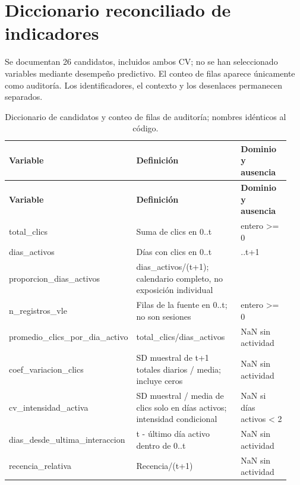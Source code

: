 \section{Diccionario reconciliado de indicadores}
Se documentan 26 candidatos, incluidos ambos CV; no se han seleccionado variables mediante desempeño predictivo. El conteo de filas aparece únicamente como auditoría. Los identificadores, el contexto y los desenlaces permanecen separados.
\Needspace{0.2\textheight}
\begingroup\small\setlength{\tabcolsep}{3pt}\renewcommand{\arraystretch}{1.16}
\begin{longtable}{>{\raggedright\arraybackslash}p{0.29\linewidth}>{\raggedright\arraybackslash}p{0.43\linewidth}>{\raggedright\arraybackslash}p{0.22\linewidth}}
\caption{Diccionario de candidatos y conteo de filas de auditoría; nombres idénticos al código.}\label{corr:diccionario}\\
\toprule
\textbf{Variable} & \textbf{Definición} & \textbf{Dominio y ausencia} \\
\midrule\endfirsthead
\toprule
\textbf{Variable} & \textbf{Definición} & \textbf{Dominio y ausencia} \\
\midrule\endhead
\bottomrule\endfoot
total\_\allowbreak{}clics & Suma de clics en 0..t & entero >= 0 \\
dias\_\allowbreak{}activos & Días con clics en 0..t & 0..t+1 \\
proporcion\_\allowbreak{}dias\_\allowbreak{}activos & dias\_\allowbreak{}activos/(t+1); calendario completo, no exposición individual & [0,1] \\
n\_\allowbreak{}registros\_\allowbreak{}vle & Filas de la fuente en 0..t; no son sesiones & entero >= 0 \\
promedio\_\allowbreak{}clics\_\allowbreak{}por\_\allowbreak{}dia\_\allowbreak{}activo & total\_\allowbreak{}clics/dias\_\allowbreak{}activos & NaN sin actividad \\
coef\_\allowbreak{}variacion\_\allowbreak{}clics & SD muestral de t+1 totales diarios / media; incluye ceros & NaN sin actividad \\
cv\_\allowbreak{}intensidad\_\allowbreak{}activa & SD muestral / media de clics solo en días activos; intensidad condicional & NaN si días activos < 2 \\
dias\_\allowbreak{}desde\_\allowbreak{}ultima\_\allowbreak{}interaccion & t - último día activo dentro de 0..t & NaN sin actividad \\
recencia\_\allowbreak{}relativa & Recencia/(t+1) & NaN sin actividad \\

\end{longtable}
